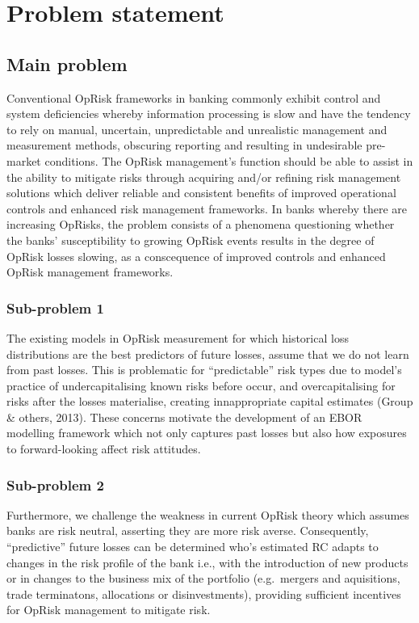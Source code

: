 \documentclass{DissertateUSU}
\begin{document}
\section{Problem statement}
\label{sec:Problem statement}

\subsection{Main problem}
\label{ssec:Main problem}

Conventional OpRisk frameworks in banking commonly exhibit control and
system deficiencies whereby information processing is slow and have the
tendency to rely on manual, uncertain, unpredictable and unrealistic
management and measurement methods, obscuring reporting and resulting in
undesirable pre-market conditions. The OpRisk management's function
should be able to assist in the ability to mitigate risks through
acquiring and/or refining risk management solutions which deliver
reliable and consistent benefits of improved operational controls and
enhanced risk management frameworks. In banks whereby there are
increasing OpRisks, the problem consists of a phenomena questioning
whether the banks' susceptibility to growing OpRisk events results in
the degree of OpRisk losses slowing, as a conscequence of improved
controls and enhanced OpRisk management frameworks.

\subsubsection{Sub-problem 1}
\label{sssec:Sub-problem 1}

The existing models in OpRisk measurement for which historical loss
distributions are the best predictors of future losses, assume that we
do not learn from past losses. This is problematic for ``predictable''
risk types due to model's practice of undercapitalising known risks
before occur, and overcapitalising for risks after the losses
materialise, creating innappropriate capital estimates (Group \& others,
2013). These concerns motivate the development of an EBOR modelling
framework which not only captures past losses but also how exposures to
forward-looking affect risk attitudes.

\subsubsection{Sub-problem 2}
\label{sssec:Sub-problem 2}

Furthermore, we challenge the weakness in current OpRisk theory which
assumes banks are risk neutral, asserting they are more risk averse.
Consequently, ``predictive'' future losses can be determined who's
estimated RC adapts to changes in the risk profile of the bank i.e.,
with the introduction of new products or in changes to the business mix
of the portfolio (e.g.~mergers and aquisitions, trade terminatons,
allocations or disinvestments), providing sufficient incentives for
OpRisk management to mitigate risk.
\end{document}
